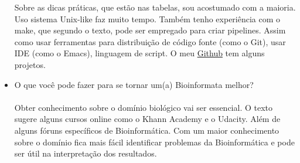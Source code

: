 \documentclass[a4paper, 12pt]{article}
\begin{document}
\begin{itemize}
  Sobre as dicas práticas, que estão nas tabelas, sou acostumado com a maioria. Uso sistema Unix-like faz muito tempo. Também tenho experiência com o make, que segundo o texto, pode ser empregado para  criar pipelines. Assim como usar ferramentas para distribuição de código fonte (como o Git), usar IDE (como o Emacs), linguagem de script. O meu \href{http://github.com/RMedeirosCosta}{Github} tem alguns projetos.
\item O que você pode fazer para se tornar um(a) Bioinformata melhor? \\\\
  Obter conhecimento sobre o domínio biológico vai ser essencial. O texto sugere alguns cursos online como o Khann Academy e o Udacity. Além de alguns fóruns específicos de Bioinformática. Com um maior conhecimento sobre o domínio fica mais fácil identificar problemas da Bioinformática e pode ser útil na interpretação dos resultados.
\end{itemize}
\end{document}
